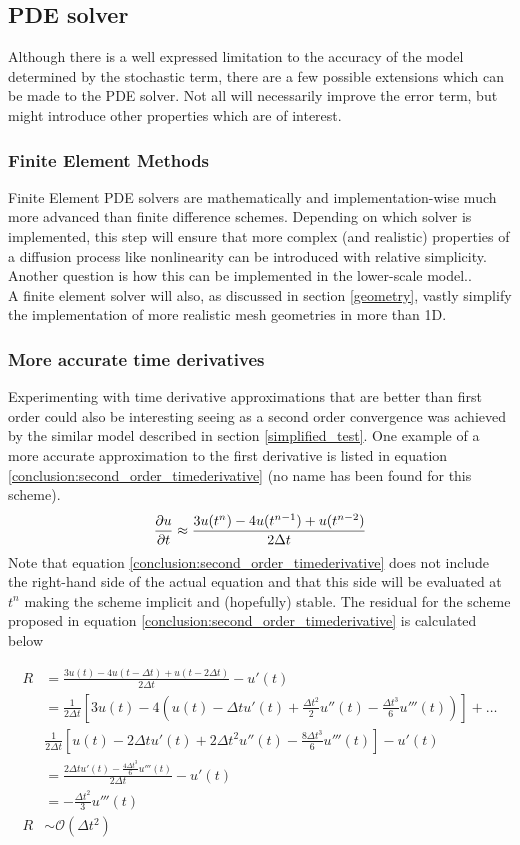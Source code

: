 \subsection{PDE solver}
Although there is a well expressed limitation to the accuracy of the model determined by the stochastic term, there are a few possible extensions which can be made to the PDE solver. 
Not all will necessarily improve the error term, but might introduce other properties which are of interest.

\subsubsection{Finite Element Methods}
Finite Element PDE solvers are mathematically and implementation-wise much more advanced than finite difference schemes. 
Depending on which solver is implemented, this step will ensure that more complex (and realistic) properties of a diffusion process like nonlinearity can be introduced with relative simplicity. 
Another question is how this can be implemented in the lower-scale model..\\
A finite element solver will also, as discussed in section \ref{geometry}, vastly simplify the implementation of more realistic mesh geometries in more than 1D. 

\subsubsection{More accurate time derivatives}
Experimenting with time derivative approximations that are better than first order could also be interesting seeing as a second order convergence was achieved by the similar model described in section \ref{simplified_test}. 
One example of a more accurate approximation to the first derivative is listed in equation \eqref{conclusion:second_order_timederivative} (no name has been found for this scheme).
\begin{equation}\label{conclusion:second_order_timederivative}
 \frac{\partial u}{\partial t} \approx \frac{3u(t^n)-4u(t^{n-1})+u(t^{n-2})}{2\Delta t}
\end{equation}
Note that equation \eqref{conclusion:second_order_timederivative} does not include the right-hand side of the actual equation and that this side will be evaluated at $t^n$ making the scheme implicit and (hopefully) stable. 
The residual for the scheme proposed in equation \eqref{conclusion:second_order_timederivative} is calculated below

\begin{align*}
 R &= \frac{3u(t)-4u(t-\Delta t)+u(t-2\Delta t)}{2\Delta t} -u'(t)\\
 &= \frac{1}{2\Delta t}\left[3u(t)-4\left(u(t)-\Delta tu'(t) +\frac{\Delta t^2}{2}u''(t) - \frac{\Delta t^3}{6}u'''(t)\right)\right] +\dots \\
 &\frac{1}{2\Delta t}\left[u(t)- 2\Delta tu'(t) + 2\Delta t^2u''(t) -\frac{8\Delta t^3}{6}u'''(t)\right] -u'(t)\\
 &= \frac{2\Delta tu'(t) -\frac{4\Delta t^3}{6}u'''(t)}{2\Delta t} - u'(t) \\
 &= -\frac{\Delta t^2}{3}u'''(t)\\
 R&\sim\mathcal O(\Delta t^2)
\end{align*}

